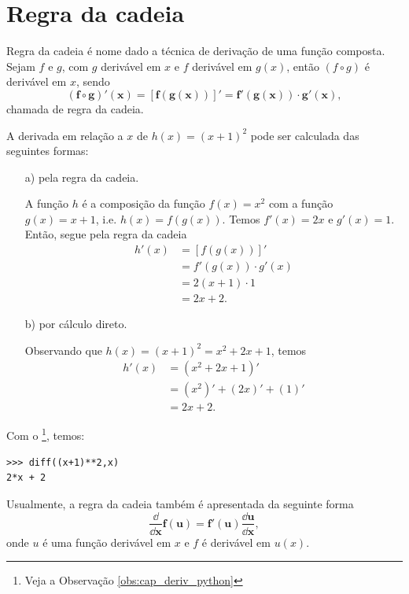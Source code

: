 \section{Regra da cadeia}\label{cap_deriv_sec_cadeia}

Regra da cadeia é nome dado a técnica de derivação de uma função composta. Sejam $f$ e $g$, com $g$ derivável em $x$ e $f$ derivável em $g(x)$, então $(f\circ g)$ é derivável em $x$, sendo
\begin{equation}
  \pmb{(f\circ g)'(x) = [f(g(x))]' = f'(g(x))\cdot g'(x)},
\end{equation}
chamada de regra da cadeia.

\begin{ex}
  A derivada em relação a $x$ de $h(x) = (x+1)^2$ pode ser calculada das seguintes formas:
  \begin{enumerate}
  \item[a)] pela regra da cadeia.

    A função $h$ é a composição da função $f(x)=x^2$ com a função $g(x)=x+1$, i.e. $h(x) = f(g(x))$. Temos $f'(x)=2x$ e $g'(x)=1$. Então, segue pela regra da cadeia
    \begin{align}
      h'(x) &= [f(g(x))]' \\
            &= f'(g(x))\cdot g'(x) \\
            &= 2(x+1)\cdot 1 \\
            &= 2x+2.
    \end{align}

  \item[b)] por cálculo direto.

    Observando que $h(x)=(x+1)^2=x^2+2x+1$, temos
    \begin{align}
      h'(x) &= (x^2+2x+1)' \\
            &= (x^2)' + (2x)' + (1)' \\
            &= 2x + 2.
    \end{align}
  \end{enumerate}

  \ifispython
  Com o \sympy\footnote{Veja a Observação \ref{obs:cap_deriv_python}}, temos:
\begin{verbatim}
>>> diff((x+1)**2,x)
2*x + 2
\end{verbatim}
  \fi  
\end{ex}

Usualmente, a regra da cadeia também é apresentada da seguinte forma
\begin{equation}\label{eq:deriv_regra_da_cadeia}
  \pmb{\frac{\dd}{\dd x}f(u) = f'(u)\frac{\dd u}{\dd x}},
\end{equation}
onde $u$ é uma função derivável em $x$ e $f$ é derivável em $u(x)$.

